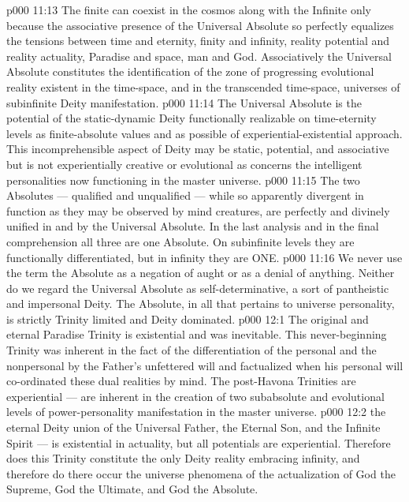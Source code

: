 \vs p000 11:13 The finite can coexist in the cosmos along with the Infinite only because the associative presence of the Universal Absolute so perfectly equalizes the tensions between time and eternity, finity and infinity, reality potential and reality actuality, Paradise and space, man and God. Associatively the Universal Absolute constitutes the identification of the zone of progressing evolutional reality existent in the time\hyp{}space, and in the transcended time\hyp{}space, universes of subinfinite Deity manifestation.
\vs p000 11:14 The Universal Absolute is the potential of the static\hyp{}dynamic Deity functionally realizable on time\hyp{}eternity levels as finite\hyp{}absolute values and as possible of experiential\hyp{}existential approach. This incomprehensible aspect of Deity may be static, potential, and associative but is not experientially creative or evolutional as concerns the intelligent personalities now functioning in the master universe.
\vs p000 11:15 \pc {} The two Absolutes --- qualified and unqualified --- while so apparently divergent in function as they may be observed by mind creatures, are perfectly and divinely unified in and by the Universal Absolute. In the last analysis and in the final comprehension all three are one Absolute. On subinfinite levels they are functionally differentiated, but in infinity they are ONE.
\vs p000 11:16 \pc We never use the term the Absolute as a negation of aught or as a denial of anything. Neither do we regard the Universal Absolute as self\hyp{}determinative, a sort of pantheistic and impersonal Deity. The Absolute, in all that pertains to universe personality, is strictly Trinity limited and Deity dominated.
\vs p000 12:1 The original and eternal Paradise Trinity is existential and was inevitable. This never\hyp{}beginning Trinity was inherent in the fact of the differentiation of the personal and the nonpersonal by the Father’s unfettered will and factualized when his personal will co\hyp{}ordinated these dual realities by mind. The post\hyp{}Havona Trinities are experiential --- are inherent in the creation of two subabsolute and evolutional levels of power\hyp{}personality manifestation in the master universe.
\vs p000 12:2 \pc {} the eternal Deity union of the Universal Father, the Eternal Son, and the Infinite Spirit --- is existential in actuality, but all potentials are experiential. Therefore does this Trinity constitute the only Deity reality embracing infinity, and therefore do there occur the universe phenomena of the actualization of God the Supreme, God the Ultimate, and God the Absolute.
